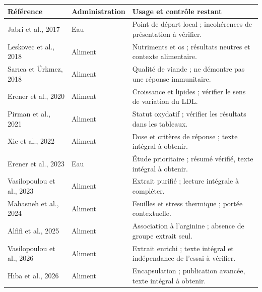 \documentclass[11pt,a4paper]{article}
\begin{document}
\begin{longtable}{@{}>{\raggedright\arraybackslash}p{3.4cm}>{\raggedright\arraybackslash}p{3.2cm}>{\raggedright\arraybackslash}p{8.3cm}@{}}
\toprule
Référence & Administration & Usage et contrôle restant \\
\midrule
\endhead
Jabri et al., 2017 & Eau & Point de départ local ; incohérences de présentation à vérifier. \\
Leskovec et al., 2018 & Aliment & Nutriments et os ; résultats neutres et contexte alimentaire. \\
Sarıca et Ürkmez, 2018 & Aliment & Qualité de viande ; ne démontre pas une réponse immunitaire. \\
Erener et al., 2020 & Aliment & Croissance et lipides ; vérifier le sens de variation du LDL. \\
Pirman et al., 2021 & Aliment & Statut oxydatif ; vérifier les résultats dans les tableaux. \\
Xie et al., 2022 & Aliment & Dose et critères de réponse ; texte intégral à obtenir. \\
Erener et al., 2023 & Eau & Étude prioritaire ; résumé vérifié, texte intégral à obtenir. \\
Vasilopoulou et al., 2023 & Aliment & Extrait purifié ; lecture intégrale à compléter. \\
Mahasneh et al., 2024 & Aliment & Feuilles et stress thermique ; portée contextuelle. \\
Alfifi et al., 2025 & Aliment & Association à l'arginine ; absence de groupe extrait seul. \\
Vasilopoulou et al., 2026 & Aliment & Extrait enrichi ; texte intégral et indépendance de l'essai à vérifier. \\
Hıba et al., 2026 & Aliment & Encapsulation ; publication avancée, texte intégral à obtenir. \\
\bottomrule
\end{longtable}

\clearpage
\renewcommand{\bibfont}{\small}
\setlength{\bibsep}{3pt}


\end{document}
